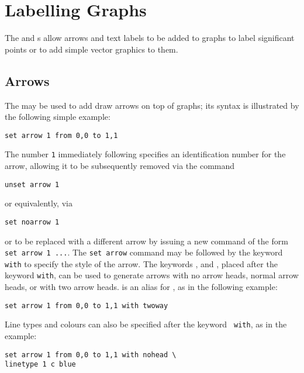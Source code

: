 \section{Labelling Graphs}

The  and s allow arrows and text labels
to be added to graphs to label significant points or to add simple vector
graphics to them.

\subsection{Arrows}

\label{sec:set_arrow} The  may be used to add
draw arrows on top of graphs; its syntax is illustrated by the following simple
example:

\begin{verbatim}
set arrow 1 from 0,0 to 1,1
\end{verbatim}

\noindent The number {\tt 1} immediately following 
specifies an identification number for the arrow, allowing it to be
subsequently removed via the command

\begin{verbatim}
unset arrow 1
\end{verbatim}

\noindent or equivalently, via

\begin{verbatim}
set noarrow 1
\end{verbatim}

\noindent or to be replaced with a different arrow by issuing a new command of
the form {\tt set arrow 1~...}.  The {\tt set arrow} command may be followed by
the keyword {\tt with} to specify the style of the arrow. The keywords
,  and , placed after the
keyword {\tt with}, can be used to generate arrows with no arrow heads, normal
arrow heads, or with two arrow heads.   is an alias for
, as in the following example:

\begin{verbatim}
set arrow 1 from 0,0 to 1,1 with twoway
\end{verbatim}

\noindent Line types and colours can also be specified after the keyword {\tt
with}, as in the example:

\begin{verbatim}
set arrow 1 from 0,0 to 1,1 with nohead \
linetype 1 c blue
\end{verbatim}

